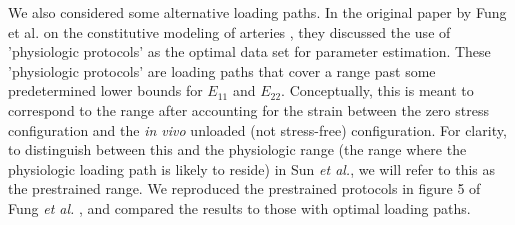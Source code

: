     We also considered some alternative loading paths. In the original paper by Fung et al. on the constitutive modeling of arteries \cite{fung_pseudoelasticity_1979}, they discussed the use of 'physiologic protocols' as the optimal data set for parameter estimation. These 'physiologic protocols' are loading paths that cover a range past some predetermined lower bounds for $E_{11}$ and $E_{22}$. Conceptually, this is meant to correspond to the range after accounting for the strain between the zero stress configuration and the \textit{in vivo} unloaded (not stress-free) configuration. For clarity, to distinguish between this and the physiologic range (the range where the physiologic loading path is likely to reside) in Sun \textit{et al.}, we will refer to this as the prestrained range. We reproduced the prestrained protocols in figure 5 of Fung \textit{et al.} \cite{fung_pseudoelasticity_1979}, and compared the results to those with optimal loading paths. 






